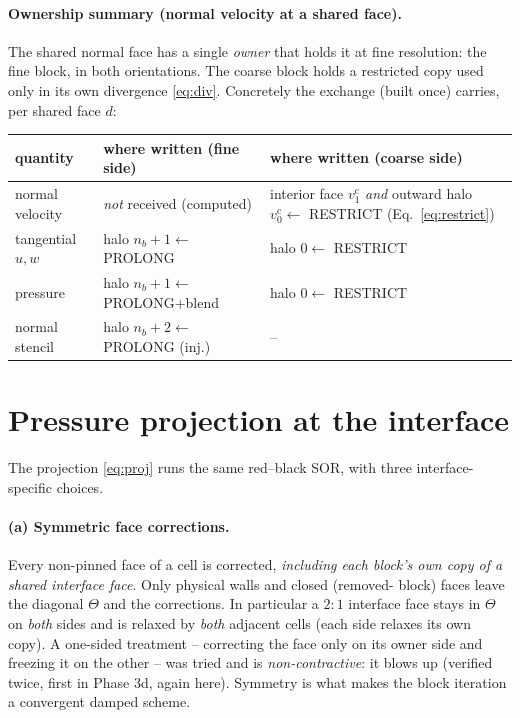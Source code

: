\documentclass[11pt]{article}
\newcommand{\coarse}{\mathrm{c}}
\begin{document}
\paragraph{Ownership summary (normal velocity at a shared face).}
The shared normal face has a single \emph{owner} that holds it at fine
resolution: the fine block, in both orientations. The coarse block holds a
restricted copy used only in its own divergence \eqref{eq:div}. Concretely
the exchange (built once) carries, per shared face $d$:
\begin{center}
\begin{tabular}{lll}
\hline
quantity & where written (fine side) & where written (coarse side)\\
\hline
normal velocity & \emph{not} received (computed) & interior face $v^\coarse_1$ \emph{and} outward halo $v^\coarse_0\leftarrow$ RESTRICT (Eq.~\ref{eq:restrict})\\
tangential $u,w$ & halo $n_b{+}1\leftarrow$ PROLONG & halo $0\leftarrow$ RESTRICT\\
pressure & halo $n_b{+}1\leftarrow$ PROLONG+blend & halo $0\leftarrow$ RESTRICT\\
normal stencil & halo $n_b{+}2\leftarrow$ PROLONG (inj.) & --\\
\hline
\end{tabular}
\end{center}

\section{Pressure projection at the interface}

The projection \eqref{eq:proj} runs the same red--black SOR, with three
interface-specific choices.

\paragraph{(a) Symmetric face corrections.}
Every non-pinned face of a cell is corrected, \emph{including each block's own
copy of a shared interface face}. Only physical walls and closed (removed-
block) faces leave the diagonal $\Theta$ and the corrections. In particular a
$2{:}1$ interface face stays in $\Theta$ on \emph{both} sides and is relaxed
by \emph{both} adjacent cells (each side relaxes its own copy). A one-sided
treatment -- correcting the face only on its owner side and freezing it on the
other -- was tried and is \emph{non-contractive}: it blows up (verified twice,
first in Phase 3d, again here). Symmetry is what makes the block iteration a
convergent damped scheme.
\end{document}
